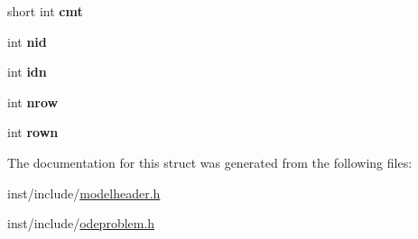 \begin{DoxyCompactItemize}
short int {\bfseries cmt}
\item 
\mbox{\label{structdatabox_a8b7d7bc8f934e7e440fc259cd8a574e0}} 
int {\bfseries nid}
\item 
\mbox{\label{structdatabox_a16379e42a8f17101c58952c4bca77f08}} 
int {\bfseries idn}
\item 
\mbox{\label{structdatabox_ab0f63d0d0d4a515fb980aff77fae79d7}} 
int {\bfseries nrow}
\item 
\mbox{\label{structdatabox_ac2bc3b6910d4d4e8edc3098cd562dc89}} 
int {\bfseries rown}
\end{DoxyCompactItemize}


The documentation for this struct was generated from the following files\+:\begin{DoxyCompactItemize}
\item 
inst/include/\hyperlink{modelheader_8h}{modelheader.\+h}\item 
inst/include/\hyperlink{odeproblem_8h}{odeproblem.\+h}\end{DoxyCompactItemize}
